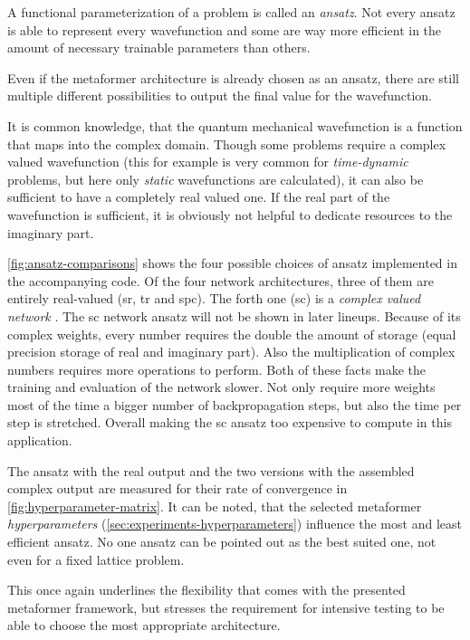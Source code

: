 A functional parameterization of a problem is called an \emph{ansatz}. 
Not every ansatz is able to represent every wavefunction and some are way more efficient in the amount of necessary trainable parameters than others.

Even if the metaformer architecture is already chosen as an ansatz, there are still multiple different possibilities to output the final value for the wavefunction.

It is common knowledge, that the quantum mechanical wavefunction is a function that maps into the complex domain.
Though some problems require a complex valued wavefunction (this for example is very common for \emph{time-dynamic} problems, but here only \emph{static} wavefunctions are calculated), it can also be sufficient to have a completely real valued one.
If the real part of the wavefunction is sufficient, it is obviously not helpful to dedicate resources to the imaginary part.

\autoref{fig:ansatz-comparisons} shows the four possible choices of ansatz implemented in the accompanying code.
Of the four network architectures, three of them are entirely real-valued (sr, tr and spc). 
The forth one (sc) is a \emph{complex valued network} \cite{deepComplexNetworks}.
The sc network ansatz will not be shown in later lineups. 
Because of its complex weights, every number requires the double the amount of storage (equal precision storage of real  and imaginary part). 
Also the multiplication of complex numbers requires more operations to perform.
Both of these facts make the training and evaluation of the network slower. 
Not only require more weights most of the time a bigger number of backpropagation steps, but also the time per step is stretched. 
Overall making the sc ansatz too expensive to compute in this application.

The ansatz with the real output and the two versions with the assembled complex output are measured for their rate of convergence in \autoref{fig:hyperparameter-matrix}.
It can be noted, that the selected metaformer \emph{hyperparameters} (\autoref{sec:experiments-hyperparameters}) influence the most and least efficient ansatz.
No one ansatz can be pointed out as the best suited one, not even for a fixed lattice problem.

This once again underlines the flexibility that comes with the presented metaformer framework, but stresses the requirement for intensive testing to be able to choose the most appropriate architecture.

